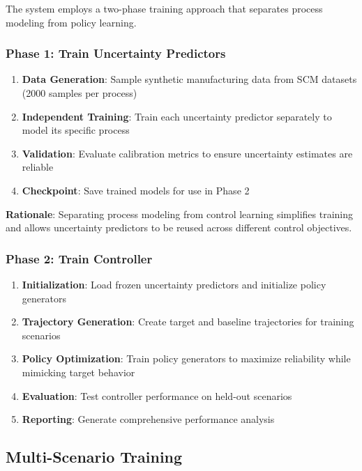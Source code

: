 \documentclass[11pt,a4paper]{article}
\begin{document}
The system employs a two-phase training approach that separates process modeling from policy learning.

\subsubsection{Phase 1: Train Uncertainty Predictors}

\begin{enumerate}
    \item \textbf{Data Generation}: Sample synthetic manufacturing data from SCM datasets (2000 samples per process)
    \item \textbf{Independent Training}: Train each uncertainty predictor separately to model its specific process
    \item \textbf{Validation}: Evaluate calibration metrics to ensure uncertainty estimates are reliable
    \item \textbf{Checkpoint}: Save trained models for use in Phase 2
\end{enumerate}

\textbf{Rationale}: Separating process modeling from control learning simplifies training and allows uncertainty predictors to be reused across different control objectives.

\subsubsection{Phase 2: Train Controller}

\begin{enumerate}
    \item \textbf{Initialization}: Load frozen uncertainty predictors and initialize policy generators
    \item \textbf{Trajectory Generation}: Create target and baseline trajectories for training scenarios
    \item \textbf{Policy Optimization}: Train policy generators to maximize reliability while mimicking target behavior
    \item \textbf{Evaluation}: Test controller performance on held-out scenarios
    \item \textbf{Reporting}: Generate comprehensive performance analysis
\end{enumerate}

\subsection{Multi-Scenario Training}
\end{document}
